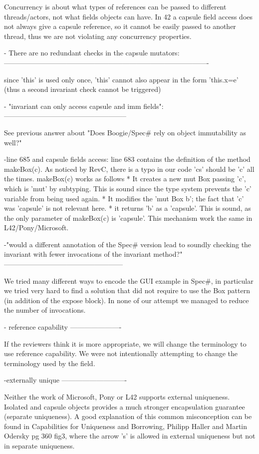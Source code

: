 Concurrency is about what types of references can be passed to different threads/actors,
not what fields objects can have.
In 42 a capsule field access does not always give a capsule reference,
so it cannot be easily passed to another thread, thus we are not violating any concurrency properties.

- There are no redundant checks in the capsule mutators:
----------------------------------------------------------------------------------------

 since 'this' is used only once, 'this' cannot also appear in the form 'this.x=e' (thus a second invariant check cannot be triggered)

- "invariant can only access capsule and imm fields":
-----------------------------------------------------

See previous answer about "Does Boogie/Spec# rely on object immutability as well?"

-line 685 and capsule fields access:
line 683 contains the definition of the method makeBox(c).
As noticed by RevC, there is a typo in our code 'cs' should be 'c' all the times.
makeBox(c) works as follows
* It creates a new mut Box passing 'c', which is 'mut' by subtyping.
This is sound since the type system prevents the 'c' variable from being used again.
* It modifies the 'mut Box b'; the fact that 'c' was 'capsule' is not relevant here.
* it returns 'b' as a 'capsule'.  This is sound, as the only parameter 
of makeBox(c) is 'capsule'. This mechanism work the same in L42/Pony/Microsoft.

-"would a different annotation of the Spec# version lead to soundly checking the invariant with fewer invocations of the invariant method?"
---------------------------------------------------

We tried many different ways to encode the GUI example in Spec#, in particular we tried very hard to find a solution that did not require to use the Box pattern (in addition of the expose block).
In none of our attempt we managed to reduce the number of invocations.

- reference capability
----------------------

If the reviewers think it is more appropriate,
we will change the terminology to use reference capability.
We were not intentionally attempting to change the terminology used by the field.

-externally unique
----------------------------

Neither the work of Microsoft, Pony or L42 supports external uniqueness.
Isolated and capsule objects provides a much stronger encapsulation guarantee (separate uniqueness).
A good explanation of this common misconception can be found in
Capabilities for Uniqueness and Borrowing, Philipp Haller and Martin Odersky pg 360 fig3,
where the arrow 's' is allowed in external uniqueness but not in separate uniqueness.

